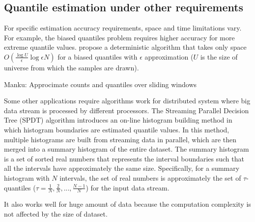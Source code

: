 \subsection{Quantile estimation under other requirements}
\label{other}
For specific estimation accuracy requirements, space and time limitations vary. For example, the biased quantiles problem requires higher accuracy for more extreme quantile values. \citeauthor{cormodeSpaceTimeefficientDeterministic2006} \cite{cormodeSpaceTimeefficientDeterministic2006} propose a deterministic algorithm that takes only space $O(\frac{\log {U}}{\epsilon} \log {\epsilon N})$ for a biased quantiles with $\epsilon$ approximation ($U$ is the size of universe from which the samples are drawn). 

Manku: Approcimate counts and quantiles over sliding windows

Some other applications require algorithms work for distributed system where big data stream is processed by different processors.
The Streaming Parallel Decision Tree (SPDT) algorithm \cite{ben-haimStreamingParallelDecision} introduces an on-line histogram building method %
in which histogram boundaries are estimated quantile values.
In this method, multiple histograms are built from streaming data in parallel, which are then merged into a summary histogram of the entire dataset. The summary histogram is a set of sorted real numbers that represents the interval boundaries such that all the intervals have approximately the same size. Specifically, for a summary histogram with $N$ intervals, the set of real numbers is approximately the set of $\tau$-quantiles ($\tau = \frac{1}{N}, \frac{2}{N}, ..., \frac{N-1}{N}$) for the input data stream.

 It also works well for huge amount of data because the computation complexity is not affected by the size of dataset.


